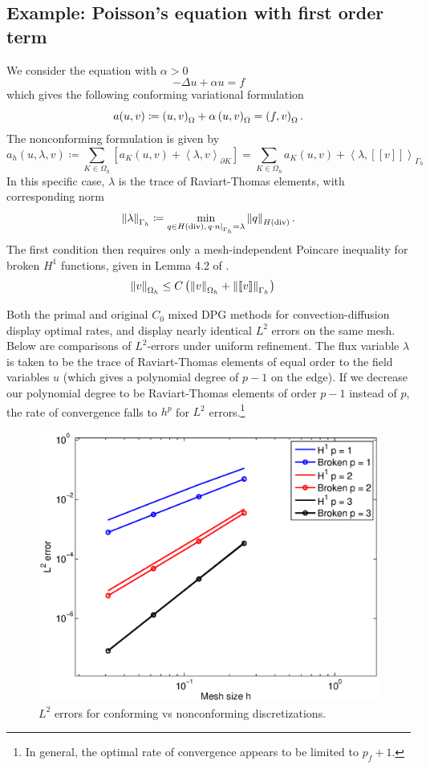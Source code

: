 \documentclass[final,leqno]{siamltex}
\newcommand{\nor}[1]{\left\| #1 \right\|}
\newcommand{\LRp}[1]{\left( #1 \right)}
\newcommand{\LRs}[1]{\left[ #1 \right]}
\newcommand{\LRa}[1]{\left\langle #1 \right\rangle}
\newcommand{\jump}[1] {\ensuremath{\LRs{\!\left[#1\right]\!}}}
\newcommand{\Gh}{\Gamma_h}
\newcommand{\Oh}{\Omega_h}
\let\grad\relax
\newcommand{\grad}{\nabla}
\begin{document}
\subsection{Example: Poisson's equation with first order term} 

We consider the equation with $\alpha > 0$
\[
-\Delta u + \alpha u = f
\]
which gives the following conforming variational formulation
\[
a(u,v) \coloneqq \LRp{\grad u,\grad v}_{\Omega} + \alpha\LRp{u,v}_{\Omega} = \LRp{f,v}_{\Omega}.
\]
The nonconforming formulation is given by 
\[
a_h(u,\lambda,v) \coloneqq \sum_{K \in \Oh}\LRs{ a_K(u,v) + \LRa{\lambda,v}_{\partial K}} = \sum_{K \in \Oh} a_K(u,v) + \LRa{\lambda,\jump{v}}_{\Gh}
\]
In this specific case, $\lambda$ is the trace of Raviart-Thomas elements, with corresponding norm
\[
\nor{\lambda}_{\Gh} \coloneqq \min_{q\in H({\rm div}), \left.q\cdot n\right|_{\Gh} = \lambda} \nor{q}_{H({\rm div})}.
\]
The first condition then requires only a mesh-independent Poincare inequality for broken $H^1$ functions, given in Lemma 4.2 of \cite{analysisDPG}.  
\begin{align*}
\nor{v}_{\Oh} &\leq C\LRp{\nor{\grad v}_{\Oh} + \nor{\jump{v}}_{\Gh}}
\end{align*}

Both the primal and original $C_0$ mixed DPG methods for convection-diffusion display optimal rates, and display nearly identical $L^2$ errors on the same mesh.  Below are comparisons of $L^2$-errors under uniform refinement.  The flux variable $\lambda$ is taken to be the trace of Raviart-Thomas elements of equal order to the field variables $u$ (which gives a polynomial degree of $p-1$ on the edge).  If we decrease our polynomial degree to be Raviart-Thomas elements of order $p-1$ instead of $p$, the rate of convergence falls to $h^p$ for $L^2$ errors.\footnote{In general, the optimal rate of convergence appears to be limited to $p_f+1$.}
%

\begin{figure}
\centering
\includegraphics[width=.6\textwidth]{figs/poisson_rates.eps}
  \caption{$L^2$ errors for conforming vs nonconforming discretizations.}
\end{figure}
\end{document}
